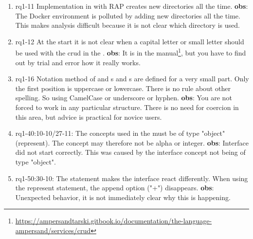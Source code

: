 \begin{enumerate}
    \item rq1-11 Implementation in  with RAP creates new directories all the time.
    \newline\textbf{obs}: The Docker environment is polluted by adding new directories all the time.
    This makes analysis difficult because it is not clear which directory is used.
    
    \item rq1-12 At the start it is not clear when a capital letter or small letter should be used with the crud in the .
    \newline\textbf{obs}: It is in the manual\footnote{\url{https://ampersandtarski.gitbook.io/documentation/the-language-ampersand/services/crud}}, 
    but you have to find out by trial and error how it really works.
    
    
    \item rq1-16 Notation method of  and s and s are defined for a very small part.
    Only the first position is uppercase or lowercase.
    There is no rule about other spelling.
    So using CamelCase or underscore or hyphen.
    \newline\textbf{obs}: You are not forced to work in any particular structure.
    There is no need for coercion in this area, but advice is practical for novice users.
     
    \item rq1-40:10-10/27-11: The concepts used in the  must be of type "object" (represent).
    The concept may therefore not be alpha or integer.
    \newline\textbf{obs}: Interface did not start correctly.
    This was caused by the interface concept not being of type "object".
    
    \item rq1-50:30-10: The  statement makes the interface react differently.
    When using the represent statement, the append option ("+") disappears.
    \newline\textbf{obs}: Unexpected behavior, it is not immediately clear why this is happening.
     
    

\end{enumerate}
